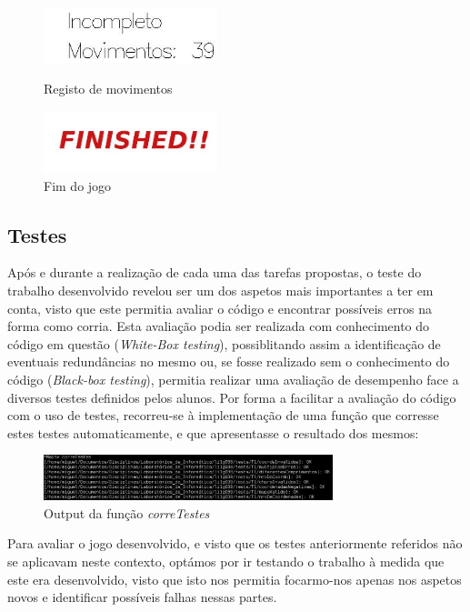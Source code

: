 \documentclass[a4paper]{article}
\begin{document}
\begin{figure}[ht]
	\centering
	\includegraphics[width=0.45\textwidth]{Recursos/contadorMovimentos.jpg} 
	\caption{Registo de movimentos}
	 \includegraphics[width=0.45\textwidth]{Recursos/final.jpg} 
	 \caption{Fim do jogo}
\end{figure}

\subsection{Testes}

Após e durante a realização de cada uma das tarefas propostas, o teste do trabalho desenvolvido revelou ser um dos aspetos mais importantes a ter em conta, visto que este permitia avaliar o código e encontrar possíveis erros na forma como corria. Esta avaliação podia ser realizada com conhecimento do código em questão (\textit{White-Box testing}), possiblitando assim a identificação de eventuais redundâncias no mesmo ou, se fosse realizado sem o conhecimento do código (\textit{Black-box testing}), permitia realizar uma avaliação de desempenho face a diversos testes definidos pelos alunos. Por forma a facilitar a avaliação do código com o uso de testes, recorreu-se à implementação de uma função que corresse estes testes automaticamente, e que apresentasse o resultado dos mesmos:

\begin{figure}[ht]
	\centering
	\includegraphics[width=0.75\textwidth]{Recursos/testeExemplo.jpg}
	\caption{Output da função \emph{correTestes}}
\end{figure}

Para avaliar o jogo desenvolvido, e visto que os testes anteriormente referidos não se aplicavam neste contexto, optámos por ir testando o trabalho à medida que este era desenvolvido, visto que isto nos permitia focarmo-nos apenas nos aspetos novos e identificar possíveis falhas nessas partes. 
\end{document}

